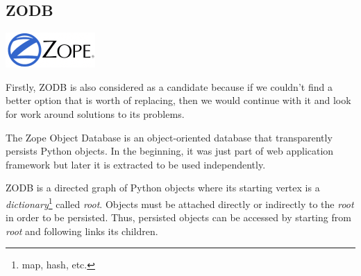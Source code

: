 \subsection{ZODB}

\vspace{-1cm} \hspace{2.9cm} \includegraphics[scale=0.6]{3/figures/zodb.png}

Firstly, \textsc{ZODB} is also considered as a candidate because if we couldn't find a better option that is worth of replacing, then we would continue with it and look for work around solutions to its problems.

The Zope Object Database is an object-oriented database that transparently persists Python objects.
In the beginning, it was just part of web application framework but later it is extracted to be used independently.

\textsc{ZODB} is a directed graph of Python objects where its starting vertex is a \textit{dictionary}\footnote{map, hash, etc.} called \textit{root}.
Objects must be attached directly or indirectly to the \textit{root} in order to be persisted.
Thus, persisted objects can be accessed by starting from \textit{root} and following links its children.

